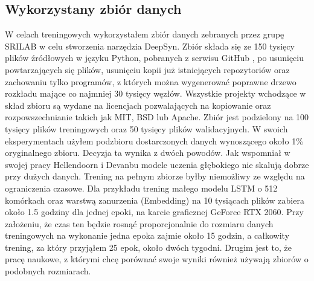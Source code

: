 \subsection {Wykorzystany zbiór danych}
W celach treningowych wykorzystałem zbiór danych zebranych przez grupę SRILAB \cite{dataset} w celu stworzenia narzędzia 
DeepSyn. Zbiór składa się ze 150 tysięcy plików źródłowych w języku Python, pobranych z serwisu GitHub \cite{github}, po 
usunięciu powtarzających się plików, usunięciu kopii już istniejących repozytoriów oraz zachowaniu tylko programów, z których
można wygenerować poprawne drzewo rozkładu mające co najmniej 30 tysięcy węzłów. Wszystkie projekty wchodzące w skład 
zbioru są wydane na licencjach pozwalających na kopiowanie oraz rozpowszechnianie takich jak MIT, BSD lub Apache. Zbiór jest 
podzielony na 100 tysięcy plików treningowych oraz 50 tysięcy plików walidacyjnych. W swoich eksperymentach użyłem podzbioru 
dostarczonych danych wynoszącego około 1\% oryginalnego zbioru. Decyzja ta wynika z dwóch powodów. Jak wspomniał w swojej 
pracy Hellendoorn i Devanbu\cite{hellendoorn} modele uczenia głębokiego nie skalują dobrze przy dużych danych. Trening na 
pełnym zbiorze byłby niemożliwy ze względu na ograniczenia czasowe. Dla przykładu trening małego modelu LSTM o 512 komórkach 
oraz warstwą zanurzenia (Embedding) na 10 tysiącach plików zabiera około 1.5 godziny dla jednej epoki, na karcie graficznej GeForce RTX 2060. 
Przy założeniu, że czas ten będzie rosnąć proporcjonalnie do rozmiaru danych treningowych na wykonanie jedna epoka zajmie 
około 15 godzin, a całkowity trening, za który przyjąłem 25 epok, około dwóch tygodni. Drugim jest to, że pracę naukowe, z 
którymi chcę porównać swoje wyniki również używają zbiorów o podobnych rozmiarach. 


